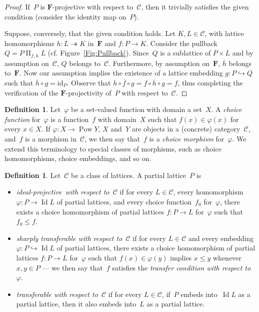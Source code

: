 \documentclass[reqno]{amsart}
\numberwithin{equation}{section}
\theoremstyle{plain}
\theoremstyle{definition}
\newtheorem{definition}[theorem]{Definition}
\theoremstyle{remark}
\numberwithin{figure}{section}
\numberwithin{table}{section}
\begin{document}
\begin{proof}
If~$P$ is ${\mathbf{F}}$-projective with respect to~${\mathcal{C}}$, then it trivially satisfies the given condition (consider the identity map on~$P$).

Suppose, conversely, that the given condition holds.
Let $K,L\in{\mathcal{C}}$, with lattice homomorphisms $h\colon L\twoheadrightarrow K$ in~${\mathbf{F}}$ and $f\colon P\to K$.
Consider the pullback $Q=P\mathbin{\Pi}_{f,h}L$ (cf. Figure~\ref{Fig:Pullback}).
Since~$Q$ is a sublattice of $P\times L$ and by assumption on~${\mathcal{C}}$, $Q$ belongs to~${\mathcal{C}}$.
Furthermore, by assumption on~${\mathbf{F}}$, ${\overline{{h}}}$ belongs to~${\mathbf{F}}$.
Now our assumption implies the existence of a lattice embedding $g\colon P\hookrightarrow Q$ such that ${\overline{{h}}}\circ g={\mathrm{id}}_P$.
Observe that $h\circ{\overline{{f}}}\circ g=f\circ{\overline{{h}}}\circ g=f$, thus completing the verification of the ${\mathbf{F}}$-projectivity of~$P$ with respect to~${\mathcal{C}}$.
\end{proof}

\begin{definition}\label{D:ChoiceFct}
Let~${\varphi}$ be a set-valued function with domain a set~$X$.
A \emph{choice function} for~${\varphi}$ is a function~$f$ with domain~$X$ such that $f(x)\in{\varphi}(x)$ for every $x\in X$.
If ${\varphi}\colon X\to\operatorname{Pow} Y$, $X$ and~$Y$ are objects in a (concrete) category~${\mathcal{C}}$, and~$f$ is a morphism in~${\mathcal{C}}$, we then say that~$f$ is a \emph{choice morphism} for~${\varphi}$.
We extend this terminology to special classes of morphisms, such as choice homomorphisms, choice embeddings, and so on.
\end{definition}

\begin{definition}\label{D:IdProj}
Let~${\mathcal{C}}$ be a class of lattices.
A partial lattice~$P$ is
\begin{itemize}
\item
\emph{{i\-de\-al-pro\-jec\-tive}\ with respect to~${\mathcal{C}}$} if for every $L\in{\mathcal{C}}$, every homomorphism ${\varphi}\colon P\to\operatorname{Id} L$ of partial lattices, and every choice function~$f_0$ for~${\varphi}$, there exists a choice homomorphism of partial lattices $f\colon P\to L$ for~${\varphi}$ such that $f_0\leq f$.

\item
\emph{sharply transferable with respect to~${\mathcal{C}}$} if for every $L\in{\mathcal{C}}$ and every embedding ${\varphi}\colon P\hookrightarrow\operatorname{Id} L$ of partial lattices, there exists a choice homomorphism of partial lattices $f\colon P\to L$ for~${\varphi}$ such that $f(x)\in{\varphi}(y)$ implies $x\leq y$ whenever $x,y\in P$ --- we then say that~$f$ satisfies the \emph{transfer condition with respect to~${\varphi}$}.

\item
\emph{transferable with respect to~${\mathcal{C}}$} if for every $L\in{\mathcal{C}}$, if~$P$ embeds into~$\operatorname{Id} L$ as a partial lattice, then it also embeds into~$L$ as a partial lattice.
\end{itemize}
\end{definition}
\end{document}
